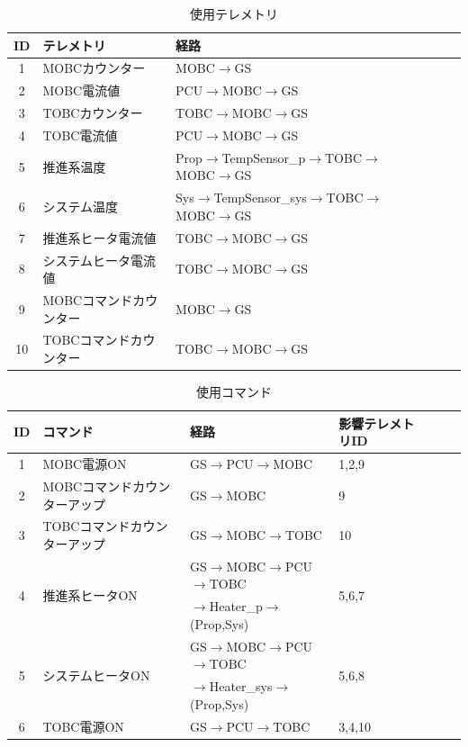 \documentclass[11pt]{article}
\begin{document}
\begin{table}[H]
   \centering
   \caption{使用テレメトリ}
   \label{tab:telemetry}
      \begin{tabular}{cllcccc} \hline
         ID&テレメトリ&経路\\ \hline
         1&MOBCカウンター&MOBC$\rightarrow$GS\\
         2&MOBC電流値&PCU$\rightarrow$MOBC$\rightarrow$GS\\
         3&TOBCカウンター&TOBC$\rightarrow$MOBC$\rightarrow$GS\\
         4&TOBC電流値&PCU$\rightarrow$MOBC$\rightarrow$GS\\
         5&推進系温度&Prop$\rightarrow$TempSensor\_p$\rightarrow$TOBC$\rightarrow$MOBC$\rightarrow$GS\\
         6&システム温度&Sys$\rightarrow$TempSensor\_sys$\rightarrow$TOBC$\rightarrow$MOBC$\rightarrow$GS\\
         7&推進系ヒータ電流値&TOBC$\rightarrow$MOBC$\rightarrow$GS\\
         8&システムヒータ電流値&TOBC$\rightarrow$MOBC$\rightarrow$GS\\
         9&MOBCコマンドカウンター&MOBC$\rightarrow$GS\\
         10&TOBCコマンドカウンター&TOBC$\rightarrow$MOBC$\rightarrow$GS\\ \hline
      \end{tabular}
\end{table}

\begin{table}[H]
   \centering
   \caption{使用コマンド}
   \label{tab:command}
      \begin{tabular}{clllccc} \hline
         ID&コマンド&経路&影響テレメトリID\\ \hline
         1&MOBC電源ON&GS$\rightarrow$PCU$\rightarrow$MOBC&1,2,9\\
         2&MOBCコマンドカウンターアップ&GS$\rightarrow$MOBC&9\\
         3&TOBCコマンドカウンターアップ&GS$\rightarrow$MOBC$\rightarrow$TOBC&10\\
         \multirow{2}{*}{4}&\multirow{2}{*}{推進系ヒータON}&GS$\rightarrow$MOBC$\rightarrow$PCU$\rightarrow$TOBC&\multirow{2}{*}{5,6,7}\\
         &&$\rightarrow$Heater\_p$\rightarrow$(Prop,Sys)&\\
         \multirow{2}{*}{5}&\multirow{2}{*}{システムヒータON}&GS$\rightarrow$MOBC$\rightarrow$PCU$\rightarrow$TOBC&\multirow{2}{*}{5,6,8}\\
         &&$\rightarrow$Heater\_sys$\rightarrow$(Prop,Sys)&\\
         6&TOBC電源ON&GS$\rightarrow$PCU$\rightarrow$TOBC&3,4,10\\ \hline
      \end{tabular}
\end{table}
\end{document}
